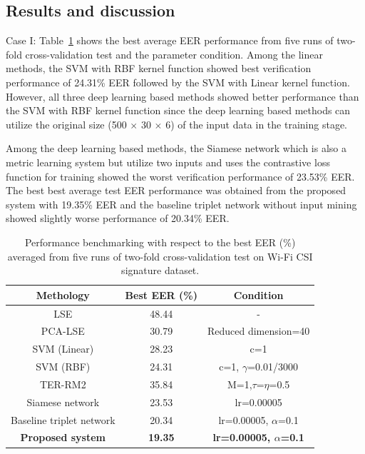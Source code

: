 \documentclass[runningheads]{llncs}
\begin{document}
\subsection{Results and discussion}

Case I: Table~\ref{tab3} shows the best average EER performance from five runs of two-fold cross-validation test and the parameter condition. Among the linear methods, the SVM with RBF kernel function showed best verification performance of 24.31\% EER followed by the SVM with Linear kernel function. However, all three deep learning based methods showed better performance than the SVM with RBF kernel function since the deep learning based methods can utilize the original size (500 $\times$ 30 $\times$ 6) of the input data in the training stage.

Among the deep learning based methods, the Siamese network which is also a metric learning system but utilize two inputs and uses the contrastive loss function for training showed the worst verification performance of 23.53\% EER. The best best average test EER performance was obtained from the proposed system with 19.35\% EER and the baseline triplet network without input mining showed slightly worse performance of 20.34\% EER.

\begin{table}[!h]
    \caption{Performance benchmarking with respect to the best EER (\%) averaged from five runs of two-fold cross-validation test on Wi-Fi CSI signature dataset.}\label{tab3}
    \centering
    \begin{tabular}{|c|c|c|}
    \hline
    Methology   &   Best EER (\%) &   Condition   \\  \hline
    LSE &   48.44   &  - \\ 
    PCA-LSE    &   30.79   &  Reduced dimension=40    \\
    SVM (Linear) &   28.23   &   c=1 \\
    SVM (RBF)    &   24.31   &   c=1, $\gamma$=0.01/3000 \\
    TER-RM2 &   35.84   &  M=1,$\tau$=$\eta$=0.5   \\     \hline
    Siamese network  &   23.53   &   lr=0.00005  \\
    Baseline triplet network &   20.34   &   lr=0.00005, $\alpha$=0.1  \\
    \textbf{Proposed system} &   \textbf{19.35}   &  \textbf{lr=0.00005, $\alpha$=0.1}  \\
     \hline
    \end{tabular}
\end{table}
\end{document}
